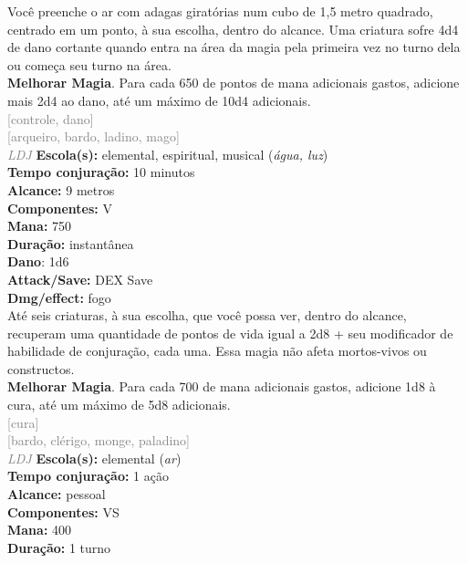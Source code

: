 \documentclass{RPG_Adventure}[2021/10/20]
\begin{document}
{\normalsize Você preenche o ar com adagas giratórias num cubo de 1,5 metro quadrado, centrado em um ponto, à sua escolha, dentro do alcance. Uma criatura sofre 4d4 de dano cortante quando entra na área da magia pela primeira vez no turno dela ou começa seu turno na área.\\\t \textbf{Melhorar Magia}. Para cada 650 de pontos de mana adicionais gastos, adicione mais 2d4 ao dano, até um máximo de 10d4 adicionais.\\}
{\scriptsize \textcolor{gray}{[controle, dano]\\}}
{\scriptsize \textcolor{gray}{[arqueiro, bardo, ladino, mago]\\}}
{\tiny \textcolor{gray}{\textit{LDJ}}}
{\small \t \textbf{Escola(s):} elemental, espiritual, musical (\textit{água, luz})\\\t \textbf{Tempo conjuração:} 10 minutos\\\t \textbf{Alcance:} 9 metros\\\t \textbf{Componentes:} V\\\t \textbf{Mana:} 750\\\t \textbf{Duração:} instantânea\\\t \textbf{Dano}: 1d6\\\t \textbf{Attack/Save:} DEX Save\\\t \textbf{Dmg/effect:} fogo\\}
{\normalsize Até seis criaturas, à sua escolha, que você possa ver, dentro do alcance, recuperam uma quantidade de pontos de vida igual a 2d8 + seu modificador de habilidade de conjuração, cada uma. Essa magia não afeta mortos-vivos ou constructos.\\\t \textbf{Melhorar Magia}. Para cada 700 de mana adicionais gastos, adicione 1d8 à cura, até um máximo de 5d8 adicionais.\\}
{\scriptsize \textcolor{gray}{[cura]\\}}
{\scriptsize \textcolor{gray}{[bardo, clérigo, monge, paladino]\\}}
{\tiny \textcolor{gray}{\textit{LDJ}}}
{\small \t \textbf{Escola(s):} elemental (\textit{ar})\\\t \textbf{Tempo conjuração:} 1 ação\\\t \textbf{Alcance:} pessoal\\\t \textbf{Componentes:} VS\\\t \textbf{Mana:} 400\\\t \textbf{Duração:} 1 turno\\}
\end{document}
